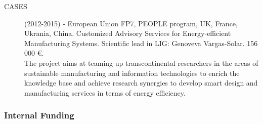 \begin{description}
\item[CASES] (2012-2015) - European Union FP7, PEOPLE program, UK, France, Ukrania, China. Customized Advisory Services for Energy-efficient Manufacturing Systems. Scientific lead in LIG: Genoveva Vargas-Solar.  156 000 \euro.\\ The project aims at teaming up transcontinental researchers in the areas of sustainable manufacturing and information technologies to enrich the knowledge base and achieve research synergies to develop smart design and manufacturing services in terms of energy efficiency. 

\end{description}

\subsubsection{Internal Funding}

